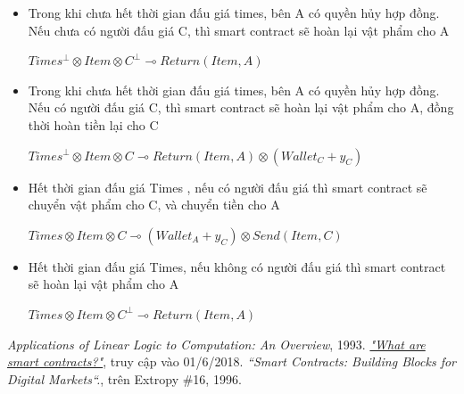 \documentclass[a4paper]{article}
\begin{document}
\begin{itemize}
    \item Trong khi chưa hết thời gian đấu giá times, bên A có quyền hủy hợp đồng. Nếu chưa có người đấu giá C, thì smart contract sẽ hoàn lại vật phẩm cho A
    \begin{center}
        $Times^{\bot} \otimes Item \otimes C^{\bot} \multimap Return(Item,A)$
    \end{center}
    
    \item Trong khi chưa hết thời gian đấu giá times, bên A có quyền hủy hợp đồng. Nếu có người đấu giá C, thì smart contract sẽ hoàn lại vật phẩm cho A, đồng thời hoàn tiền lại cho C\\
    \begin{center}
        $Times^{\bot} \otimes Item \otimes C \multimap Return(Item, A) \otimes (Wallet_{C} + y_{C})$ 
    \end{center}
    
    \item Hết thời gian đấu giá Times , nếu có người đấu giá thì smart contract sẽ chuyển vật phẩm cho C, và chuyển tiền cho A\\
    \begin{center}
        $Times \otimes Item \otimes C \multimap (Wallet_{A} + y_{C}) \otimes Send(Item,C)$
    \end{center}
    
    \item Hết thời gian đấu giá Times, nếu không có người đấu giá thì smart contract sẽ hoàn lại vật phẩm cho A\\
    \begin{center}
        $Times \otimes Item \otimes C^{\bot} \multimap Return(Item,A)$
    \end{center}
\end{itemize}

\begin{thebibliography}{99999}
 {\em Applications of Linear Logic to Computation: An Overview}, 1993.
 {\em \hyperlink{https://www.cryptoninjas.net/what-are-smart-contracts/}{"What are smart contracts?"}}, truy cập vào 01/6/2018.
 {\em “Smart Contracts: Building Blocks for Digital Markets“.}, trên Extropy \#16, 1996.


\end{thebibliography}
\end{document}
